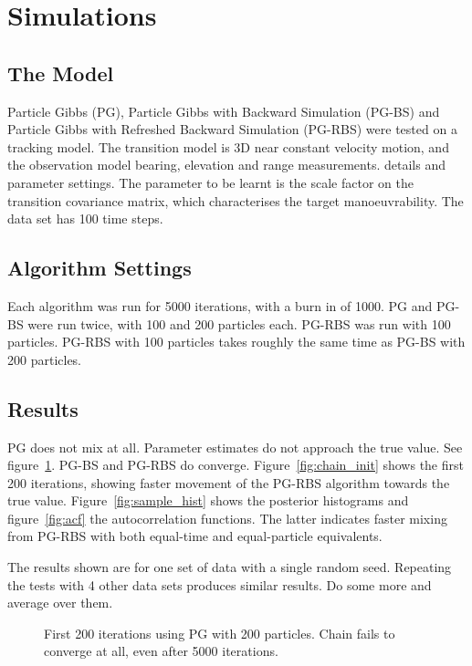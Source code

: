 \documentclass{article}
\begin{document}
\section{Simulations}

\subsection{The Model}
Particle Gibbs (PG), Particle Gibbs with Backward Simulation (PG-BS) and Particle Gibbs with Refreshed Backward Simulation (PG-RBS) were tested on a tracking model. The transition model is 3D near constant velocity motion, and the observation model bearing, elevation and range measurements. {\meta details and parameter settings.} The parameter to be learnt is the scale factor on the transition covariance matrix, which characterises the target manoeuvrability. The data set has 100 time steps.

\subsection{Algorithm Settings}
Each algorithm was run for 5000 iterations, with a burn in of 1000. PG and PG-BS were run twice, with 100 and 200 particles each. PG-RBS was run with 100 particles. PG-RBS with 100 particles takes roughly the same time as PG-BS with 200 particles.

\subsection{Results}
PG does not mix at all. Parameter estimates do not approach the true value. See figure~\ref{fig:chain_init_fail}. PG-BS and PG-RBS do converge. Figure~\ref{fig:chain_init} shows the first 200 iterations, showing faster movement of the PG-RBS algorithm towards the true value. Figure~\ref{fig:sample_hist} shows the posterior histograms and figure~\ref{fig:acf} the autocorrelation functions. The latter indicates faster mixing from PG-RBS with both equal-time and equal-particle equivalents.

The results shown are for one set of data with a single random seed. Repeating the tests with 4 other data sets produces similar results. {\meta Do some more and average over them.}

\begin{figure}
\centering

\caption{First 200 iterations using PG with 200 particles. Chain fails to converge at all, even after 5000 iterations.}
\label{fig:chain_init_fail}
\end{figure}
\end{document}
